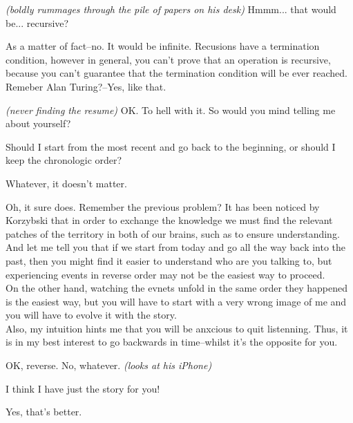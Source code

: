 \documentclass[11pt,a4paper,oneside]{memoir}
\begin{document}
\begin{description}[itemsep=1ex,leftmargin=1cm]
\item[Ronen] \textit{(boldly rummages through the pile of papers on
    his desk)} Hmmm... that would be... recursive?

\item[Oleg] As a matter of fact--no. It would be infinite. Recusions
  have a termination condition, however in general, you can't prove
  that an operation is recursive, because you can't guarantee that
  the termination condition will be ever reached.\\
  Remeber Alan Turing?--Yes, like that.

\item[Ronen] \textit{(never finding the resume)} OK. To hell with it.
  So would you mind telling me about yourself?

\item[Oleg] Should I start from the most recent and go back to the
  beginning, or should I keep the chronologic order?

\item[Ronen] Whatever, it doesn't matter.

\item[Oleg] Oh, it sure does. Remember the previous problem? It has
  been noticed by Korzybski that in order to exchange the knowledge
  we must find the relevant patches of the territory in both of our
  brains, such as to ensure understanding.\\
  And let me tell you that if we start from today and go all the
  way back into the past, then you might find it easier to understand
  who are you talking to, but experiencing events in reverse order
  may not be the easiest way to proceed.\\
  On the other hand, watching the evnets unfold in the same order
  they happened is the easiest way, but you will have to start with
  a very wrong image of me and you will have to evolve it with the
  story.\\
  Also, my intuition hints me that you will be anxcious to quit
  listenning. Thus, it is in my best interest to go backwards in
  time--whilst it's the opposite for you.

\item[Ronen] OK, reverse. No, whatever. \textit{(looks at his iPhone)}

\item[Oleg] I think I have just the story for you!

\item[Ronen] Yes, that's better.


\end{description}
\end{document}
